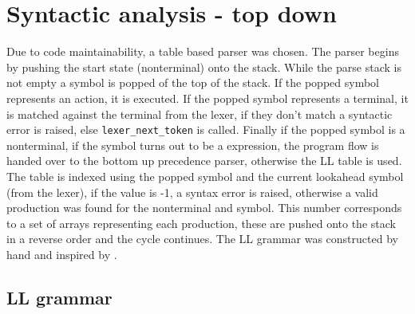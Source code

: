 \documentclass[11pt]{article}
\begin{document}
\section{Syntactic analysis - top down}
Due to code maintainability, a table based parser was chosen. The parser begins by pushing the start state (nonterminal) onto the stack. While the parse stack is not empty a symbol is popped of the top of the stack. If the popped symbol represents an action, it is executed. If the popped symbol represents a terminal, it is matched against the terminal from the lexer, if they don't match a syntactic error is raised, else \texttt{lexer\_next\_token} is called. Finally if the popped symbol is a nonterminal, if the symbol turns out to be a expression, the program flow is handed over to the bottom up precedence parser, otherwise the LL table is used. The table is indexed using the popped symbol and the current lookahead symbol (from the lexer), if the value is -1, a syntax error is raised, otherwise a valid production was found for the nonterminal and symbol. This number corresponds to a set of arrays representing each production, these are pushed onto the stack in a reverse order and the cycle continues.\cite[p.~211]{10.5555/77624} The LL grammar was constructed by hand and inspired by \cite[Appendix A.2]{10.5555/523017}.
\subsection{LL grammar}
\end{document}
